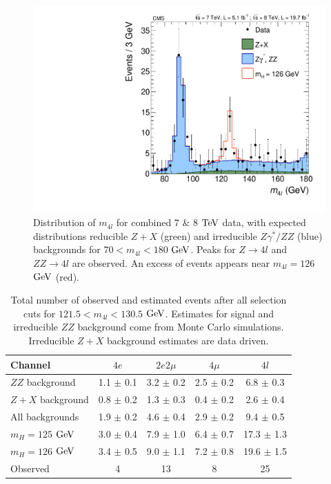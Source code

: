 \begin{figure}[htbp]
\begin{center}
\includegraphics[width=.7\linewidth]{HiggsDiscovery/figures/ZZMass_7Plus8TeV_70-180_3GeV.pdf}
\caption[$m_{4l}$ Distributions of $4l$ Events, $m_{4l}<180$ $\rm{GeV}$]{Distribution of $m_{4l}$ for combined $7$  $\&$ $8$ $\rm{TeV}$ data, with expected distributions reducible $Z+X$ (green) and irreducible $Z\gamma^{*}/ZZ$ (blue) backgrounds for $70< m_{4l} < 180$ $\rm{GeV}$. Peaks for $Z\rightarrow 4l$ and $ZZ\rightarrow 4l$ are observed. An excess of events appears near $m_{4l} = 126$ $\rm{GeV}$ (red).}
\label{fig:m4lPlotZoom}
\end{center}
\end{figure}

\begin{table}[htbp]
\begin{center}
\begin{tabular}{l|c|c|c|c}
\hline \hline
      Channel        & $4e$ & $2e2\mu$ & $4\mu$  & $4l$ \\
      \hline
      $ZZ$ background &  1.1  $\pm$  0.1  &  3.2  $\pm$  0.2  &  2.5  $\pm$  0.2  &  6.8 $\pm$ 0.3  \\
      $Z + X$ background &  0.8  $\pm$  0.2  &  1.3  $\pm$  0.3  &  0.4  $\pm$  0.2  &  2.6 $\pm$ 0.4 \\
      \hline
      All backgrounds            &  1.9  $\pm$  0.2   &  4.6  $\pm$ 0.4  & 2.9  $\pm$ 0.2  & 9.4  $\pm$ 0.5\\
      \hline
      $m_H =  125$ $\rm{GeV}$ &  3.0  $\pm$  0.4  &  7.9  $\pm$  1.0  &  6.4  $\pm$  0.7  & 17.3  $\pm$ 1.3 \\
      $m_H =  126$ $\rm{GeV}$ &  3.4  $\pm$  0.5  &  9.0  $\pm$  1.1  &  7.2  $\pm$  0.8  & 19.6  $\pm$ 1.5 \\
      \hline
      Observed  & 4 & 13 & 8 & 25 \\
\hline \hline
\end{tabular}
\caption[Number of Observed $4l$ Events in $121.5 < m_{4l} < 130.5$ $\rm{GeV}$]{Total number of observed and estimated events after all selection cuts for $121.5 < m_{4l} < 130.5$ $\rm{GeV}$. Estimates for signal and irreducible $ZZ$ background come from Monte Carlo simulations. Irreducible $Z+X$ background estimates are data driven.
\label{tbl:ZZ4lEventsNarrowRange}}
\end{center}
\end{table}


